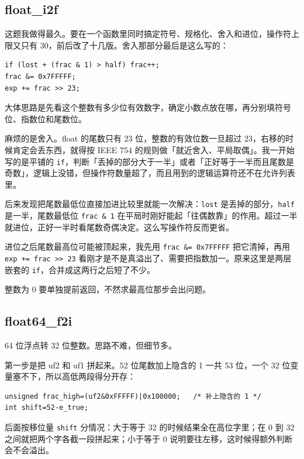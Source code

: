 \documentclass[11pt, a4paper]{ctexart}
\begin{document}
\subsection{float\_i2f}

这题我做得最久。要在一个函数里同时搞定符号、规格化、舍入和进位，操作符上限又只有 30，前后改了十几版。舍入那部分最后是这么写的：

\begin{lstlisting}[style=c]
if (lost + (frac & 1) > half) frac++;
frac &= 0x7FFFFF;
exp += frac >> 23;
\end{lstlisting}

大体思路是先看这个整数有多少位有效数字，确定小数点放在哪，再分别填符号位、指数位和尾数位。

麻烦的是舍入。float 的尾数只有 23 位，整数的有效位数一旦超过 23，右移的时候肯定会丢东西，就得按 IEEE 754 的规则做「就近舍入、平局取偶」。我一开始写的是平铺的 \texttt{if}，判断「丢掉的部分大于一半」或者「正好等于一半而且尾数是奇数」，逻辑上没错，但操作符数量超了，而且用到的逻辑运算符还不在允许列表里。

后来发现把尾数最低位直接加进比较里就能一次解决：\texttt{lost} 是丢掉的部分，\texttt{half} 是一半，尾数最低位 \texttt{frac \& 1} 在平局时刚好能起「往偶数靠」的作用。超过一半就进位，正好一半时看尾数奇偶决定。这么写操作符反而更省。

进位之后尾数最高位可能被顶起来，我先用 \texttt{frac \&= 0x7FFFFF} 把它清掉，再用 \texttt{exp += frac >> 23} 看刚才是不是真溢出了、需要把指数加一。原来这里是两层嵌套的 \texttt{if}，合并成这两行之后短了不少。

整数为 0 要单独提前返回，不然求最高位那步会出问题。

\subsection{float64\_f2i}

64 位浮点转 32 位整数。思路不难，但细节多。

第一步是把 uf2 和 uf1 拼起来。52 位尾数加上隐含的 1 一共 53 位，一个 32 位变量塞不下，所以高低两段得分开存：

\begin{lstlisting}[style=c]
unsigned frac_high=(uf2&0xFFFFF)|0x100000;   /* 补上隐含的 1 */
int shift=52-e_true;
\end{lstlisting}

后面按移位量 \texttt{shift} 分情况：大于等于 32 的时候结果全在高位字里；在 0 到 32 之间就把两个字各截一段拼起来；小于等于 0 说明要往左移，这时候得额外判断会不会溢出。
\end{document}
